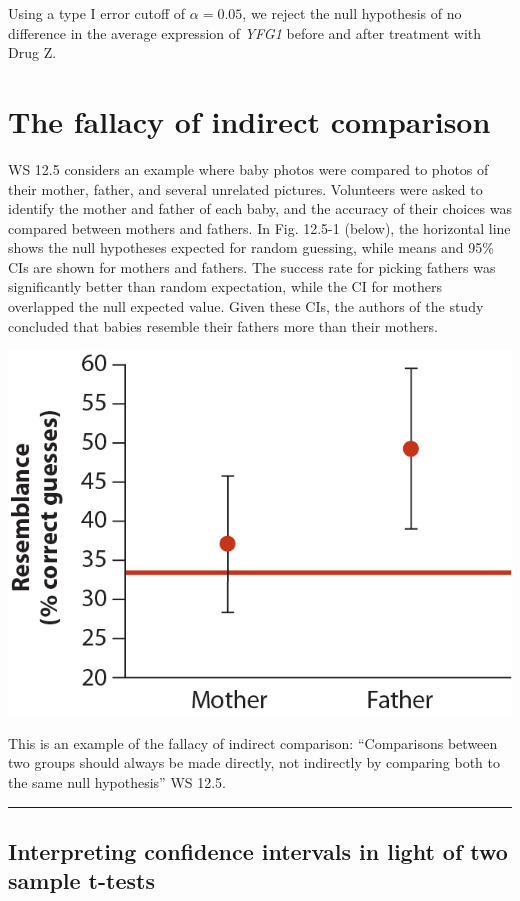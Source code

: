 \documentclass[]{book}
\theoremstyle{definition}
\theoremstyle{definition}
\theoremstyle{definition}
\theoremstyle{remark}
\begin{document}
Using a type I error cutoff of \(\alpha = 0.05\), we reject the null
hypothesis of no difference in the average expression of \emph{YFG1}
before and after treatment with Drug Z.

\hypertarget{the-fallacy-of-indirect-comparison}{%
\section{The fallacy of indirect
comparison}\label{the-fallacy-of-indirect-comparison}}

WS 12.5 considers an example where baby photos were compared to photos
of their mother, father, and several unrelated pictures. Volunteers were
asked to identify the mother and father of each baby, and the accuracy
of their choices was compared between mothers and fathers. In Fig.
12.5-1 (below), the horizontal line shows the null hypotheses expected
for random guessing, while means and 95\% CIs are shown for mothers and
fathers. The success rate for picking fathers was significantly better
than random expectation, while the CI for mothers overlapped the null
expected value. Given these CIs, the authors of the study concluded that
babies resemble their fathers more than their mothers.

\includegraphics[width=0.75\linewidth]{./figures/whitlock_12.5-1}

This is an example of the fallacy of indirect comparison: ``Comparisons
between two groups should always be made directly, not indirectly by
comparing both to the same null hypothesis'' WS 12.5.

\begin{center}\rule{0.5\linewidth}{\linethickness}\end{center}

\hypertarget{interpreting-confidence-intervals-in-light-of-two-sample-t-tests}{%
\subsection{Interpreting confidence intervals in light of two sample
t-tests}\label{interpreting-confidence-intervals-in-light-of-two-sample-t-tests}}
\end{document}
